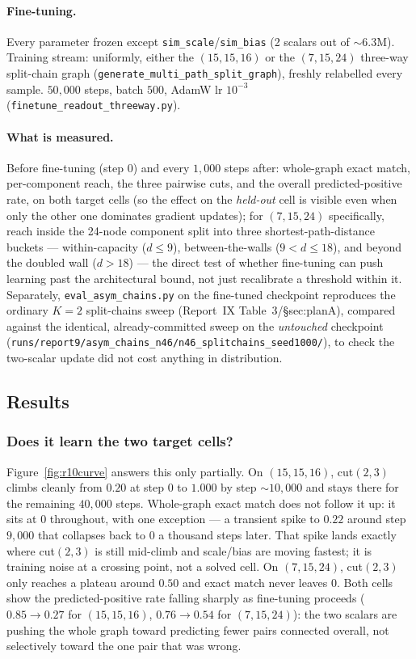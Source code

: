 \documentclass[11pt,a4paper]{article}
\begin{document}
\paragraph{Fine-tuning.} Every parameter frozen except \texttt{sim\_scale}/\texttt{sim\_bias}
(2 scalars out of $\sim$6.3M). Training stream: uniformly, either the $(15,15,16)$ or the
$(7,15,24)$ three-way split-chain graph (\texttt{generate\_multi\_path\_split\_graph}), freshly
relabelled every sample. $50{,}000$ steps, batch $500$, AdamW lr $10^{-3}$
(\texttt{finetune\_readout\_threeway.py}).

\paragraph{What is measured.} Before fine-tuning (step $0$) and every $1{,}000$ steps after:
whole-graph exact match, per-component reach, the three pairwise cuts, and the overall
predicted-positive rate, on both target cells (so the effect on the \emph{held-out} cell is
visible even when only the other one dominates gradient updates); for $(7,15,24)$ specifically,
reach inside the 24-node component split into three shortest-path-distance buckets ---
within-capacity ($d\le9$), between-the-walls ($9<d\le18$), and beyond the doubled wall
($d>18$) --- the direct test of whether fine-tuning can push learning past the architectural
bound, not just recalibrate a threshold within it. Separately, \texttt{eval\_asym\_chains.py} on
the fine-tuned checkpoint reproduces the ordinary $K{=}2$ split-chains sweep (Report~IX
Table~3/\S sec:planA), compared against the identical, already-committed sweep on the
\emph{untouched} checkpoint (\texttt{runs/report9/asym\_chains\_n46/n46\_splitchains\_seed1000/}),
to check the two-scalar update did not cost anything in distribution.

\subsection{Results}
\label{sec:results}

\subsubsection{Does it learn the two target cells?}
\label{sec:res-curve}

Figure~\ref{fig:r10curve} answers this only partially. On $(15,15,16)$, cut$(2,3)$ climbs
cleanly from $0.20$ at step $0$ to $1.000$ by step $\sim\!10{,}000$ and stays there for the
remaining $40{,}000$ steps. Whole-graph exact match does not follow it up: it sits at $0$
throughout, with one exception --- a transient spike to $0.22$ around step $9{,}000$ that
collapses back to $0$ a thousand steps later. That spike lands exactly where cut$(2,3)$ is
still mid-climb and scale/bias are moving fastest; it is training noise at a crossing point,
not a solved cell. On $(7,15,24)$, cut$(2,3)$ only reaches a plateau around $0.50$ and exact
match never leaves $0$. Both cells show the predicted-positive rate falling sharply as
fine-tuning proceeds ($0.85\to0.27$ for $(15,15,16)$, $0.76\to0.54$ for $(7,15,24)$): the two
scalars are pushing the whole graph toward predicting fewer pairs connected overall, not
selectively toward the one pair that was wrong.
\end{document}
